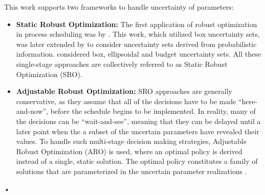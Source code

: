 This work supports two frameworks to handle uncertainty of parameters:

\begin{itemize}
\item \textbf{Static Robust Optimization: } The first application of robust optimization in process scheduling was by \cite{LIN20041069}. This work, which utilized box uncertainty sets, was later extended by \cite{JANAK2007171} to consider uncertainty sets derived from probabilistic information. \cite{LiIerapetritou} considered box, ellipsoidal and budget uncertainty sets. All these single-stage approaches are collectively referred to as Static Robust Optimization (SRO).

\item \textbf{Adjustable Robust Optimization: } SRO approaches are generally conservative, as they assume that all of the decisions have to be made 	``here-and-now'', before the schedule begins to be implemented. In reality, many of the decisions can be ``wait-and-see'', meaning that they can be delayed until a later point when the a subset of the uncertain parameters have revealed their values. To handle such multi-stage decision making strategies, Adjustable Robust Optimization (ARO) is used, where an optimal policy is derived instead of a single, static solution. The optimal policy constitutes a family of solutions that are parameterized in the uncertain parameter realizations \citep{lappas}.

\end{itemize}•
